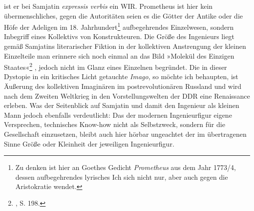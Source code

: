 \documentclass[%
	fontsize=10pt,%
	twoside,%
	headings=optiontoheadandtoc,%
	showtrims]{scrbook}
\begin{document}
\par ist er bei Samjatin \emph{expressis verbis} ein WIR. Prometheus ist hier kein übermenschliches, gegen die Autoritäten \textendash{} seien es die Götter der Antike oder die Höfe der Adeligen im 18. Jahrhundert\footnote{Zu denken ist hier an Goethes Gedicht \emph{Prometheus} aus dem Jahr 1773/4, dessen aufbegehrendes lyrisches Ich sich nicht nur, aber auch gegen die Aristokratie wendet.}  \textendash{} aufbegehrendes Einzelwesen, sondern Inbegriff eines Kollektivs von Konstrukteuren. Die Größe des Ingenieurs liegt gemäß Samjatins literarischer Fiktion in der kollektiven Anstrengung der kleinen Einzelteile \textendash{} man erinnere sich noch einmal an das Bild »Molekül des Einzigen Staates«\footnote{\cite[][]{samjatin2003a}, S. 198.}  \textendash{}, jedoch nicht im Glanz eines Einzelnen begründet. Die in dieser Dystopie in ein kritisches Licht getauchte \emph{Imago}, so möchte ich behaupten, ist Äußerung des kollektiven Imaginären im postrevolutionären Russland und wird nach dem Zweiten Weltkrieg in den Vorstellungswelten der DDR eine Renaissance erleben. Was der Seitenblick auf Samjatin und damit den Ingenieur als kleinen Mann jedoch ebenfalls verdeutlicht: Das der modernen Ingenieurfigur eigene Versprechen, technisches Know-how nicht als Selbstzweck, sondern für die Gesellschaft einzusetzen, bleibt auch hier hörbar \textendash{} ungeachtet der im übertragenen Sinne Größe oder Kleinheit der jeweiligen Ingenieurfigur.
\end{document}
